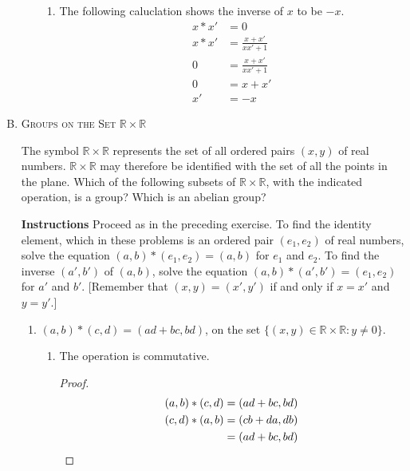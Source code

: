 \documentclass[twoside]{amsart}
\newcommand{\Reals}{\mathbb{R}{}}
\begin{document}
\begin{enumerate}[A.]
\begin{enumerate}[1.]
\begin{enumerate}
	    \item The following caluclation shows the inverse of $x$ to be
	    $-x$.
	    \begin{align*}
	       x * x' & = 0                      \\
	       x * x' & = \frac{x + x'}{xx' + 1} \\
		   0  & = \frac{x + x'}{xx' + 1} \\
		   0  & = x + x' \\
		   x' & = -x
	    \end{align*}
	 \end{enumerate}
   \end{enumerate}

   \item \textsc{Groups on the Set $\Reals \times \Reals$}

   The symbol $\Reals \times \Reals$ represents the set of all ordered pairs
   $(x,y)$ of real numbers.  $\Reals \times \Reals$ may therefore be identified
   with the set of all the points in the plane.  Which of the following subsets
   of $\Reals \times \Reals$, with the indicated operation, is a group?  Which
   is an abelian group?

   \textbf{Instructions} Proceed as in the preceding exercise. To find the
   identity element, which in these problems is an ordered pair $(e_1, e_2)$ of
   real numbers, solve the equation $(a,b) * (e_1, e_2) = (a,b)$ for $e_1$ and
   $e_2$. To find the inverse $(a',b')$ of $(a,b)$, solve the equation
   $(a,b)*(a',b')=(e_1,e_2)$ for $a'$ and $b'$. [Remember that $(x,y)=(x',y')$
   if and only if $x=x'$ and $y=y'$.]

      \begin{enumerate}[1.]
	 \item $(a,b)*(c,d)=(ad+bc,bd)$, on the set $\{(x,y) \in \Reals
	 \times \Reals : y \ne 0\}$.
	 \begin{enumerate}
	    \item The operation is commutative.
	    \begin{proof}
	       \begin{align*}
		  (a,b)*(c,d) & = (ad+bc,bd) \\
		  (c,d)*(a,b) & = (cb+da,db) \\
			      & = (ad+bc,bd) \qedhere
	       \end{align*}
	    \end{proof}


\end{enumerate}
\end{enumerate}
\end{enumerate}
\end{document}
